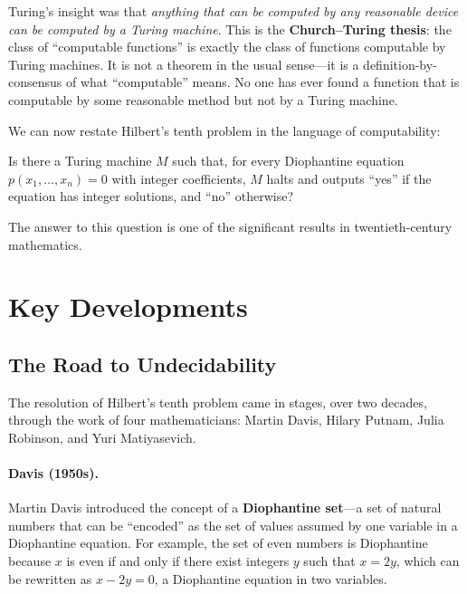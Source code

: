 Turing's insight was that \emph{anything that can be computed by any reasonable device can be computed by a Turing machine}. This is the \textbf{Church--Turing thesis}: the class of ``computable functions'' is exactly the class of functions computable by Turing machines. It is not a theorem in the usual sense---it is a definition-by-consensus of what ``computable'' means. No one has ever found a function that is computable by some reasonable method but not by a Turing machine.

We can now restate Hilbert's tenth problem in the language of computability:

\begin{problem_statement}
Is there a Turing machine $M$ such that, for every Diophantine equation $p(x_1, \ldots, x_n) = 0$ with integer coefficients, $M$ halts and outputs ``yes'' if the equation has integer solutions, and ``no'' otherwise?
\end{problem_statement}

The answer to this question is one of the significant results in twentieth-century mathematics.

\section{Key Developments}

\subsection{The Road to Undecidability}

The resolution of Hilbert's tenth problem came in stages, over two decades, through the work of four mathematicians: Martin Davis, Hilary Putnam, Julia Robinson, and Yuri Matiyasevich.

\paragraph{Davis (1950s).} Martin Davis introduced the concept of a \textbf{Diophantine set}---a set of natural numbers that can be ``encoded'' as the set of values assumed by one variable in a Diophantine equation. For example, the set of even numbers is Diophantine because $x$ is even if and only if there exist integers $y$ such that $x = 2y$, which can be rewritten as $x - 2y = 0$, a Diophantine equation in two variables.

